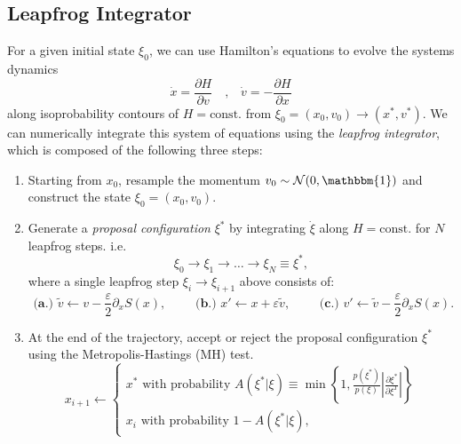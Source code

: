 \documentclass[a4paper,11pt]{article}
\newcommand{\acceptProb}{%
            A(\xi^{\ast}|\xi) \equiv \min\left\{1,
            \frac{p(\xi^{\ast})}{p(\xi)}%
        \left|\frac{\partial \xi^{\ast}}{\partial \xi^{T}}\right|\right\}
    }
\begin{document}
\subsection{\label{subsec:lfint}Leapfrog Integrator}
%
For a given initial state \(\xi_{0}\), we can use Hamilton's equations to
evolve the systems dynamics 
%
\begin{equation}
    \dot{x} = \frac{\partial H}{\partial v}\quad \text{,} \quad \dot{v} = -\frac{\partial H}{\partial x}
\end{equation}
%
along isoprobability contours of \(H =\text{const.}\) from \(\xi_{0} = (x_{0},
v_{0})\rightarrow (x^{\ast}, v^{\ast})\).
%
We can numerically integrate this system of equations using the \emph{leapfrog
integrator}, which is composed of the following three steps:
%
\begin{enumerate}
    \item Starting from \(x_{0}\), resample the momentum \(v_{0}\sim
        \mathcal{N}(0, \mathbbm{1})\) and construct the state \(\xi_{0} =
        (x_{0}, v_{0})\).
    \item Generate a \emph{proposal configuration} \(\xi^{\ast}\) by
        integrating \(\dot\xi\) along \(H = \mathrm{const.}\)
        for \(N\) leapfrog steps.
        i.e.
        \begin{equation}
            \xi_{0}\rightarrow \xi_{1}\rightarrow\ldots\rightarrow%
            \xi_{N} \equiv \xi^{\ast},
        \end{equation}
        where a single leapfrog step \(\xi_{i} \rightarrow \xi_{i+1}\) above
        consists of: 
        \begin{equation}
            \textbf{ (a.) }%
              \tilde{v}\leftarrow v - \frac{\varepsilon}{2}\partial_{x} S(x),
            \quad\quad
            \textbf{ (b.) }%
              x' \leftarrow x + \varepsilon \tilde{v},
            \quad\quad
            \textbf{ (c.) }%
              v' \leftarrow \tilde{v} - \frac{\varepsilon}{2}\partial_{x} S(x).
        \end{equation}
    \item At the end of the trajectory, accept or reject the proposal
        configuration \(\xi^{\ast}\) using the Metropolis-Hastings (MH) test.
        \begin{equation}
            x_{i+1} \leftarrow
            \begin{cases}
                x^{\ast}\text{ with probability } \acceptProb \\
                x_{i}\text{ with probability } 1 - A(\xi^{\ast}|\xi),
            \end{cases}
        \end{equation}
\end{enumerate}
\end{document}
